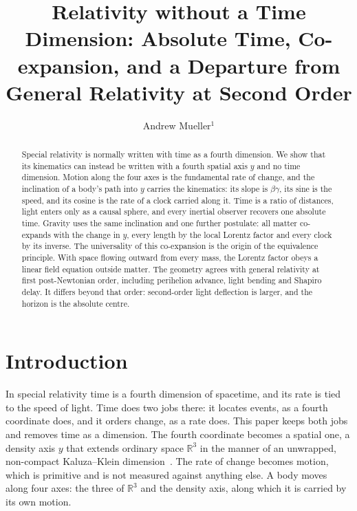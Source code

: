 \documentclass{iopjournal}
\begin{document}

\title{Relativity without a Time Dimension: Absolute Time, Co-expansion, and a Departure from General Relativity at Second Order}

\author{Andrew Mueller$^1$}




\begin{abstract}
Special relativity is normally written with time as a fourth dimension. We show that its kinematics can instead be written with a fourth spatial axis $y$ and no time dimension. Motion along the four axes is the fundamental rate of change, and the inclination of a body's path into $y$ carries the kinematics: its slope is $\beta\gamma$, its sine is the speed, and its cosine is the rate of a clock carried along it. Time is a ratio of distances, light enters only as a causal sphere, and every inertial observer recovers one absolute time. Gravity uses the same inclination and one further postulate: all matter co-expands with the change in $y$, every length by the local Lorentz factor and every clock by its inverse. The universality of this co-expansion is the origin of the equivalence principle. With space flowing outward from every mass, the Lorentz factor obeys a linear field equation outside matter. The geometry agrees with general relativity at first post-Newtonian order, including perihelion advance, light bending and Shapiro delay. It differs beyond that order: second-order light deflection is larger, and the horizon is the absolute centre.
\end{abstract}

\section{Introduction}\label{sec1}

In special relativity time is a fourth dimension of spacetime, and its rate is tied to the speed of light. Time does two jobs there: it locates events, as a fourth coordinate does, and it orders change, as a rate does. This paper keeps both jobs and removes time as a dimension. The fourth coordinate becomes a spatial one, a density axis $y$ that extends ordinary space $\mathbb{R}^3$ in the manner of an unwrapped, non-compact Kaluza--Klein dimension~\cite{Kaluza1921, Klein1926}. The rate of change becomes motion, which is primitive and is not measured against anything else. A body moves along four axes: the three of $\mathbb{R}^3$ and the density axis, along which it is carried by its own motion.
\end{document}
